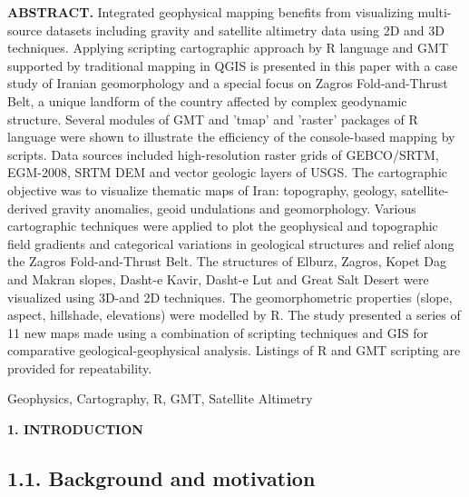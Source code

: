 \documentclass[12pt,a4paper,oneside]{article}
\def \newsection{\vspace{12pt}\textbf}
\def \newpar{\vspace{6pt}}
\begin{document}
{\bf ABSTRACT.} Integrated geophysical mapping benefits from visualizing multi-source datasets including gravity and satellite altimetry data using 2D and 3D techniques. Applying scripting cartographic approach by R language and GMT supported by traditional mapping in QGIS is presented in this paper with a case study of Iranian geomorphology and a special focus on Zagros Fold-and-Thrust Belt, a unique landform of the country affected by complex geodynamic structure. Several modules of GMT and 'tmap' and 'raster' packages of R language were shown to illustrate the efficiency of the console-based mapping by scripts. Data sources included high-resolution raster grids of GEBCO/SRTM, EGM-2008, SRTM DEM and vector geologic layers of USGS. The cartographic objective was to visualize thematic maps of Iran: topography, geology, satellite-derived gravity anomalies, geoid undulations and geomorphology. Various cartographic techniques were applied to plot the geophysical and topographic field gradients and categorical variations in geological structures and relief along the Zagros Fold-and-Thrust Belt. The structures of Elburz, Zagros, Kopet Dag and Makran slopes, Dasht-e Kavir, Dasht-e Lut and Great Salt Desert were visualized using 3D-and 2D techniques. The geomorphometric properties (slope, aspect, hillshade, elevations) were modelled by R. The study presented a series of 11 new maps made using a combination of scripting techniques and GIS for comparative geological-geophysical analysis. Listings of R and GMT scripting are provided for repeatability. 

\newpar {\bf Keywords:} Geophysics, Cartography, R, GMT, Satellite Altimetry


\newsection {1. INTRODUCTION}

\subsection*{1.1. Background and motivation}
\end{document}
